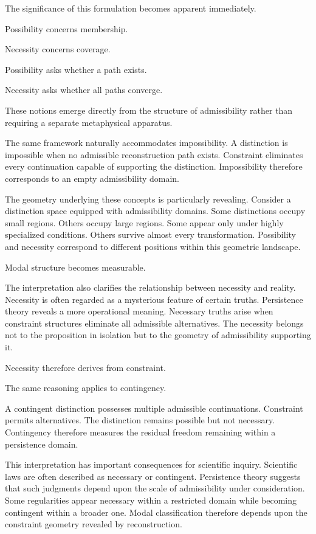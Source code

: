 \documentclass[12pt,oneside]{article}
\theoremstyle{definition}
\begin{document}
The significance of this formulation becomes apparent immediately.

Possibility concerns membership.

Necessity concerns coverage.

Possibility asks whether a path exists.

Necessity asks whether all paths converge.

These notions emerge directly from the structure of admissibility rather than requiring a separate metaphysical apparatus.

The same framework naturally accommodates impossibility. A distinction is impossible when no admissible reconstruction path exists. Constraint eliminates every continuation capable of supporting the distinction. Impossibility therefore corresponds to an empty admissibility domain.

The geometry underlying these concepts is particularly revealing. Consider a distinction space equipped with admissibility domains. Some distinctions occupy small regions. Others occupy large regions. Some appear only under highly specialized conditions. Others survive almost every transformation. Possibility and necessity correspond to different positions within this geometric landscape.

Modal structure becomes measurable.

The interpretation also clarifies the relationship between necessity and reality. Necessity is often regarded as a mysterious feature of certain truths. Persistence theory reveals a more operational meaning. Necessary truths arise when constraint structures eliminate all admissible alternatives. The necessity belongs not to the proposition in isolation but to the geometry of admissibility supporting it.

Necessity therefore derives from constraint.

The same reasoning applies to contingency.

A contingent distinction possesses multiple admissible continuations. Constraint permits alternatives. The distinction remains possible but not necessary. Contingency therefore measures the residual freedom remaining within a persistence domain.

This interpretation has important consequences for scientific inquiry. Scientific laws are often described as necessary or contingent. Persistence theory suggests that such judgments depend upon the scale of admissibility under consideration. Some regularities appear necessary within a restricted domain while becoming contingent within a broader one. Modal classification therefore depends upon the constraint geometry revealed by reconstruction.
\end{document}
